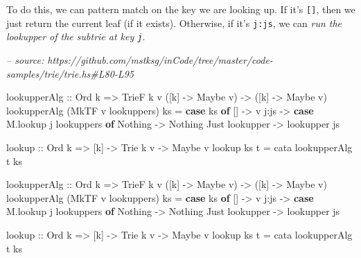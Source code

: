 \documentclass[]{article}
\newenvironment{Shaded}{}{}
\newcommand{\CommentTok}[1]{\textcolor[rgb]{0.38,0.63,0.69}{\textit{#1}}}
\newcommand{\DataTypeTok}[1]{\textcolor[rgb]{0.56,0.13,0.00}{#1}}
\newcommand{\FunctionTok}[1]{\textcolor[rgb]{0.02,0.16,0.49}{#1}}
\newcommand{\KeywordTok}[1]{\textcolor[rgb]{0.00,0.44,0.13}{\textbf{#1}}}
\newcommand{\NormalTok}[1]{#1}
\newcommand{\OtherTok}[1]{\textcolor[rgb]{0.00,0.44,0.13}{#1}}
\begin{document}
To do this, we can pattern match on the key we are looking up. If it's
\texttt{{[}{]}}, then we just return the current leaf (if it exists). Otherwise,
if it's \texttt{j:js}, we can \emph{run the lookupper of the subtrie at key
\texttt{j}}.

\begin{Shaded}
\begin{Highlighting}[]
\CommentTok{-- source: https://github.com/mstksg/inCode/tree/master/code-samples/trie/trie.hs#L80-L95}

\NormalTok{lookupperAlg}
\OtherTok{    ::} \DataTypeTok{Ord}\NormalTok{ k}
    \OtherTok{=>} \DataTypeTok{TrieF}\NormalTok{ k v ([k] }\OtherTok{->} \DataTypeTok{Maybe}\NormalTok{ v)}
    \OtherTok{->}\NormalTok{ ([k] }\OtherTok{->} \DataTypeTok{Maybe}\NormalTok{ v)}
\NormalTok{lookupperAlg (}\DataTypeTok{MkTF}\NormalTok{ v lookuppers) ks }\FunctionTok{=} \KeywordTok{case}\NormalTok{ ks }\KeywordTok{of}
\NormalTok{    []   }\OtherTok{->}\NormalTok{ v}
\NormalTok{    j}\FunctionTok{:}\NormalTok{js }\OtherTok{->} \KeywordTok{case}\NormalTok{ M.lookup j lookuppers }\KeywordTok{of}
      \DataTypeTok{Nothing}        \OtherTok{->} \DataTypeTok{Nothing}
      \DataTypeTok{Just}\NormalTok{ lookupper }\OtherTok{->}\NormalTok{ lookupper js}
    
\NormalTok{lookup}
\OtherTok{    ::} \DataTypeTok{Ord}\NormalTok{ k}
    \OtherTok{=>}\NormalTok{ [k]}
    \OtherTok{->} \DataTypeTok{Trie}\NormalTok{ k v}
    \OtherTok{->} \DataTypeTok{Maybe}\NormalTok{ v}
\NormalTok{lookup ks t }\FunctionTok{=}\NormalTok{ cata lookupperAlg t ks}

\NormalTok{lookupperAlg}
\OtherTok{    ::} \DataTypeTok{Ord}\NormalTok{ k}
    \OtherTok{=>} \DataTypeTok{TrieF}\NormalTok{ k v ([k] }\OtherTok{->} \DataTypeTok{Maybe}\NormalTok{ v)}
    \OtherTok{->}\NormalTok{ ([k] }\OtherTok{->} \DataTypeTok{Maybe}\NormalTok{ v)}
\NormalTok{lookupperAlg (}\DataTypeTok{MkTF}\NormalTok{ v lookuppers) ks }\FunctionTok{=} \KeywordTok{case}\NormalTok{ ks }\KeywordTok{of}
\NormalTok{    []   }\OtherTok{->}\NormalTok{ v}
\NormalTok{    j}\FunctionTok{:}\NormalTok{js }\OtherTok{->} \KeywordTok{case}\NormalTok{ M.lookup j lookuppers }\KeywordTok{of}
      \DataTypeTok{Nothing}        \OtherTok{->} \DataTypeTok{Nothing}
      \DataTypeTok{Just}\NormalTok{ lookupper }\OtherTok{->}\NormalTok{ lookupper js}
    
\NormalTok{lookup}
\OtherTok{    ::} \DataTypeTok{Ord}\NormalTok{ k}
    \OtherTok{=>}\NormalTok{ [k]}
    \OtherTok{->} \DataTypeTok{Trie}\NormalTok{ k v}
    \OtherTok{->} \DataTypeTok{Maybe}\NormalTok{ v}
\NormalTok{lookup ks t }\FunctionTok{=}\NormalTok{ cata lookupperAlg t ks}
\end{Highlighting}
\end{Shaded}
\end{document}
